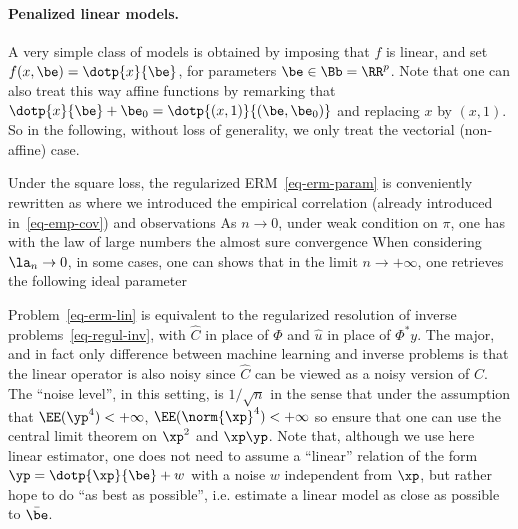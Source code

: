 \paragraph{Penalized linear models.}

A very simple class of models is obtained by imposing that $f$ is linear, and set $f(x,\be)=\dotp{x}{\be}$, for parameters $\be \in \Bb=\RR^p$. Note that one can also treat this way affine functions by remarking that $\dotp{x}{\be}+\be_0=\dotp{(x,1)}{(\be,\be_0)}$ and replacing $x$ by $(x,1)$.  So in the following, without loss of generality, we only treat the vectorial (non-affine) case. 

Under the square loss, the regularized ERM~\eqref{eq-erm-param} is conveniently rewritten as 
where we introduced the empirical correlation (already introduced in~\eqref{eq-emp-cov}) and observations
As $n \rightarrow 0$, under weak condition on $\pi$, one has with the law of large numbers the almost sure convergence
When considering $\la_n \rightarrow 0$, in some cases, one can shows that in the limit $n \rightarrow +\infty$, one retrieves the following ideal parameter 

Problem~\eqref{eq-erm-lin} is equivalent to the regularized resolution of inverse problems~\eqref{eq-regul-inv}, with $\hat C$ in place of $\Phi$ and $\hat u$ in place of $\Phi^* y$.
%
The major, and in fact only difference between machine learning and inverse problems is that the linear operator is also noisy since $\hat C$ can be viewed as a noisy version of $C$. The ``noise level'', in this setting, is $1/\sqrt{n}$ in the sense that
under the assumption that $\EE(\yp^4)<+\infty$, $\EE(\norm{\xp}^4)<+\infty$ so ensure that one can use the central limit theorem on $\xp^2$ and $\xp\yp$. Note that, although we use here linear estimator, one does not need to assume a ``linear'' relation of the form $\yp=\dotp{\xp}{\be} + w$ with a noise $w$ independent from $\xp$, but rather hope to do ``as best as possible'', i.e. estimate a linear model as close as possible to $\bar\be$. 

